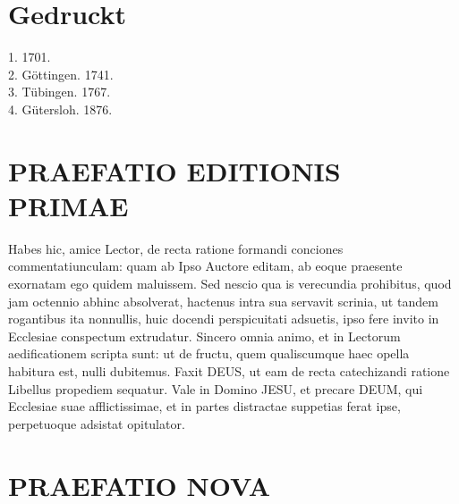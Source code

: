 \section{Gedruckt}

\begin{center}
1. 1701.\\
2. Göttingen. 1741.\\
3. Tübingen. 1767.\\
4. Gütersloh. 1876.
\end{center}

\section{PRAEFATIO EDITIONIS PRIMAE}

Habes hic, amice Lector, de recta ratione formandi conciones commentatiunculam: quam ab Ipso Auctore editam, ab eoque praesente exornatam ego quidem maluissem. Sed nescio qua is verecundia prohibitus, quod jam octennio abhinc absolverat, hactenus intra sua servavit scrinia, ut tandem rogantibus ita nonnullis, huic docendi perspicuitati adsuetis, ipso fere invito in Ecclesiae conspectum extrudatur. Sincero omnia animo, et in Lectorum aedificationem scripta sunt: ut de fructu, quem qualiscumque haec opella habitura est, nulli dubitemus. Faxit DEUS, ut eam de recta catechizandi ratione Libellus propediem sequatur. Vale in Domino JESU, et precare DEUM, qui Ecclesiae suae afflictissimae, et in partes distractae suppetias ferat ipse, perpetuoque adsistat opitulator.

\section{PRAEFATIO NOVA}

